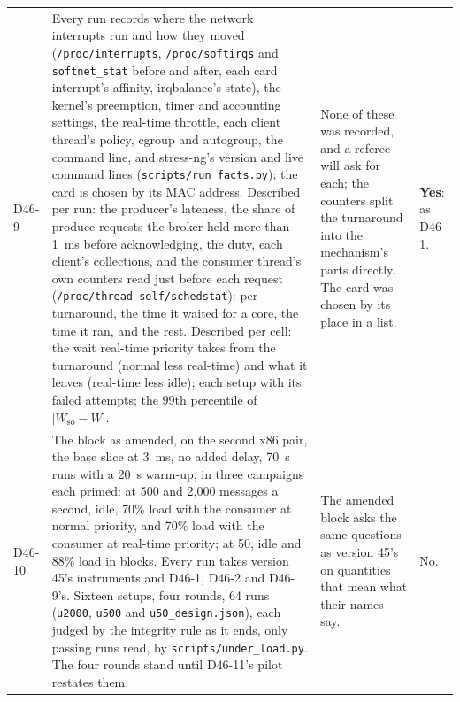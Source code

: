 \documentclass[11pt]{article}
\begin{document}
{\begin{longtable}{@{}p{1.1cm} >{\raggedright\arraybackslash}p{6.1cm} >{\raggedright\arraybackslash}p{6.0cm} >{\raggedright\arraybackslash}p{2.2cm}@{}}
D46-9 & Every run records where the network interrupts run and how they moved (\texttt{/proc/interrupts}, \texttt{/proc/softirqs} and \texttt{softnet\_stat} before and after, each card interrupt's affinity, irqbalance's state), the kernel's preemption, timer and accounting settings, the real-time throttle, each client thread's policy, cgroup and autogroup, the command line, and stress-ng's version and live command lines (\texttt{scripts/run\_facts.py}); the card is chosen by its MAC address. Described per run: the producer's lateness, the share of produce requests the broker held more than 1~ms before acknowledging, the duty, each client's collections, and the consumer thread's own counters read just before each request (\texttt{/proc/thread-self/schedstat}): per turnaround, the time it waited for a core, the time it ran, and the rest. Described per cell: the wait real-time priority takes from the turnaround (normal less real-time) and what it leaves (real-time less idle); each setup with its failed attempts; the 99th percentile of $|W_{\mathrm{so}} - W|$. & None of these was recorded, and a referee will ask for each; the counters split the turnaround into the mechanism's parts directly. The card was chosen by its place in a list. & \textbf{Yes}: as D46-1. \\
D46-10 & The block as amended, on the second x86 pair, the base slice at 3~ms, no added delay, 70~s runs with a 20~s warm-up, in three campaigns each primed: at 500 and 2,000 messages a second, idle, 70\% load with the consumer at normal priority, and 70\% load with the consumer at real-time priority; at 50, idle and 88\% load in blocks. Every run takes version 45's instruments and D46-1, D46-2 and D46-9's. Sixteen setups, four rounds, 64 runs (\texttt{u2000}, \texttt{u500} and \texttt{u50\_design.json}), each judged by the integrity rule as it ends, only passing runs read, by \texttt{scripts/under\_load.py}. The four rounds stand until D46-11's pilot restates them. & The amended block asks the same questions as version 45's on quantities that mean what their names say. & No. \\

\end{longtable}}
\end{document}
